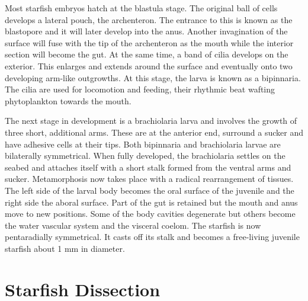 \documentclass[]{book}
\begin{document}
Most starfish embryos hatch at the blastula stage. The original ball of cells develops a lateral pouch, the archenteron. The entrance to this is known as the blastopore and it will later develop into the anus. Another invagination of the surface will fuse with the tip of the archenteron as the mouth while the interior section will become the gut. At the same time, a band of cilia develops on the exterior. This enlarges and extends around the surface and eventually onto two developing arm-like outgrowths. At this stage, the larva is known as a bipinnaria. The cilia are used for locomotion and feeding, their rhythmic beat wafting phytoplankton towards the mouth.

The next stage in development is a brachiolaria larva and involves the growth of three short, additional arms. These are at the anterior end, surround a sucker and have adhesive cells at their tips. Both bipinnaria and brachiolaria larvae are bilaterally symmetrical. When fully developed, the brachiolaria settles on the seabed and attaches itself with a short stalk formed from the ventral arms and sucker. Metamorphosis now takes place with a radical rearrangement of tissues. The left side of the larval body becomes the oral surface of the juvenile and the right side the aboral surface. Part of the gut is retained but the mouth and anus move to new positions. Some of the body cavities degenerate but others become the water vascular system and the visceral coelom. The starfish is now pentaradially symmetrical. It casts off its stalk and becomes a free-living juvenile starfish about 1 mm in diameter.

\hypertarget{starfish-dissection}{%
\section{Starfish Dissection}\label{starfish-dissection}}
\end{document}
